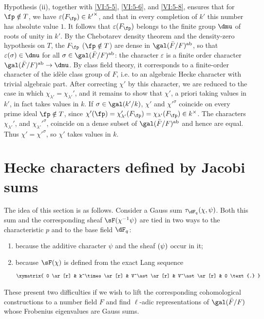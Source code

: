 \documentclass[oneside]{book}
\begin{document}
Hypothesis (ii), together with \ref{VI:5-5}, \ref{VI:5-6}, and \ref{VI:5-8}, ensures that 
for $\fp\notin T$, we have $\varepsilon(F_\fp)\in {k'}^\times$, and that in every 
completion of $k'$ this number has absolute value $1$. It follows that 
$\varepsilon(F_\fp)$ belongs to the finite group $\dmu$ of roots of unity 
in $k'$. By the Chebotarev density theorem and the density-zero hypothesis 
on $T$, the $F_\fp$ ($\fp\notin T$) are dense in 
  $\gal(\bar F/F)^\text{ab}$, so that $\varepsilon(\sigma)\in \dmu$ for all 
$\sigma\in \gal(\bar F/F)^\text{ab}$: the character $\varepsilon$ is a 
  finite order character $\gal(\bar F/F)^\text{ab}\to \dmu$. By 
class field theory, it corresponds to a finite-order character 
of the idèle class group of $F$, i.e. to an algebraic Hecke character 
with trivial algebraic part. After correcting $\chi'$ by this 
character, we are reduced to the case in which 
$\chi_{\lambda'}=\chi_{\lambda'}'$, and it remains to show that $\chi'$, 
a priori taking values in $k'$, in fact takes values in $k$. If 
$\sigma\in \gal(k'/k)$, $\chi'$ and ${\chi'}^\sigma$ coincide on every prime 
ideal $\fp\notin T$, since 
$\chi'(\fp) = \chi'_{\lambda'}(F_\fp) = \chi_{\lambda'}(F_\fp) \in k^\times$. 
The characters $\chi_{\lambda'}'$, and ${\chi_{\lambda'}'}^\sigma$, coincide 
on a dense subset of $\gal(\bar F/F)^\text{ab}$ and hence are equal. Thus 
$\chi'={\chi'}^\sigma$, so $\chi'$ takes values in $k$. 










\section{Hecke characters defined by Jacobi sums}\label{VI:6}

The idea of this section is as follows. Consider a Gauss sum 
$\tau_{\dF_q}(\chi,\psi)$. Both this sum and the corresponding sheaf 
$\sF(\chi^{-1}\psi)$ are tied in two ways to the characteristic $p$ and to the 
base field $\dF_q$: 
\begin{enumerate}[\indent a)]
  \item because the additive character $\psi$ and the sheaf 
    $\sf(\psi)$ occur in it; 
  \item because $\sF(\chi)$ is defined from the exact Lang sequence 
    \[\xymatrix{
      0 \ar[r] 
        & k^\times \ar[r] 
        & V^\ast \ar[r] 
        & V^\ast \ar[r] 
        & 0 \text{.} 
    }\]
\end{enumerate}
These present two difficulties if we wish to lift the corresponding 
cohomological constructions to a number field $F$ and find 
$\ell$-adic representations of $\gal(\bar F/F)$ whose Frobenius eigenvalues 
are Gauss sums. 
\end{document}
